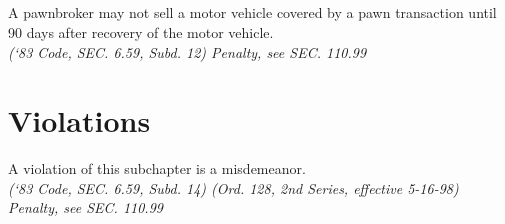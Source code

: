 \subsection{}
A pawnbroker may not sell a motor vehicle covered by a pawn transaction until 90 days after recovery of the motor vehicle.\\
\emph{(‘83 Code, SEC. 6.59, Subd. 12)  Penalty, see SEC. 110.99}
\section{Violations}
A violation of this subchapter is a misdemeanor.\\
\emph{(‘83 Code, SEC. 6.59, Subd. 14)  (Ord. 128, 2nd Series, effective 5-16-98)  Penalty, see SEC. 110.99}

